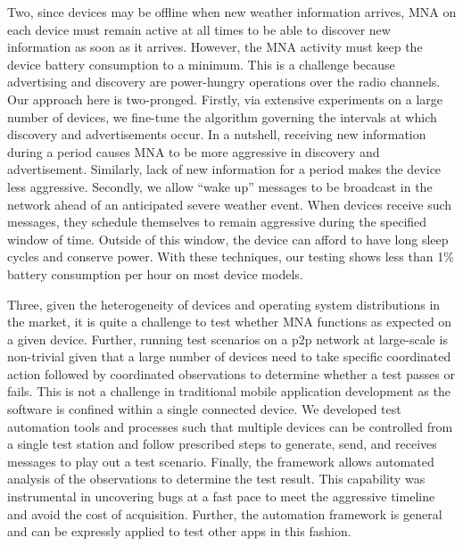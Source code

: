 \documentclass[conference]{IEEEtran}
\begin{document}
Two, since devices may be offline when new weather information arrives, MNA on each device must remain active at all times to be able to discover new information as soon as it arrives. However, the MNA activity must keep the device battery consumption to a minimum. This is a challenge because advertising and discovery are power-hungry operations over the radio channels. Our approach here is two-pronged. Firstly, via extensive experiments on a large number of devices, we fine-tune the algorithm governing the intervals at which discovery and advertisements occur. In a nutshell, receiving new information during a period causes MNA to be more aggressive in discovery and advertisement. Similarly, lack of new information for a period makes the device less aggressive. Secondly, we allow ``wake up'' messages to be broadcast in the network ahead of an anticipated severe weather event. When devices receive such messages, they schedule themselves to remain aggressive during the specified window of time. Outside of this window, the device can afford to have long sleep cycles and conserve power. With these techniques, our testing shows less than 1\% battery consumption per hour on most device models.

Three, given the heterogeneity of devices and operating system distributions in the market, it is quite a challenge to test whether MNA functions as expected on a given device. Further, running test scenarios on a p2p network at large-scale is non-trivial given that a large number of devices need to take specific coordinated action followed by coordinated observations to determine whether a test passes or fails. This is not a challenge in traditional mobile application development as the software is confined within a single connected device. We developed test automation tools and processes such that multiple devices can be controlled from a single test station and follow prescribed steps to generate, send, and receives messages to play out a test scenario. Finally, the framework allows automated analysis of the observations to determine the test result. This capability was instrumental in uncovering bugs at a fast pace to meet the aggressive timeline and avoid the cost of acquisition. Further, the automation framework is general and can be expressly applied to test other apps in this fashion.
\end{document}
